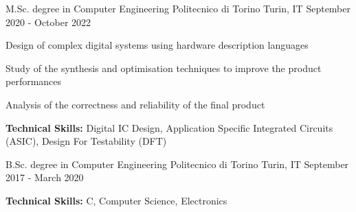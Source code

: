 

\begin{cventries}

  \cventry
    {M.Sc. degree in Computer Engineering} %
    {Politecnico di Torino} %
    {Turin, IT} %
    {September 2020 - October 2022} %
    {
      \begin{cvitems} %
        \item {Design of complex digital systems using hardware description languages}
        \item {Study of the synthesis and optimisation techniques to improve the product performances}
        \item {Analysis of the correctness and reliability of the final product}
        \item {\textbf{Technical Skills:} Digital IC Design, Application Specific Integrated Circuits (ASIC), Design For Testability (DFT)}
      \end{cvitems}
    }
    
  \cventry
    {B.Sc. degree in Computer Engineering} %
    {Politecnico di Torino} %
    {Turin, IT} %
    {September 2017 - March 2020} %
    {
      \begin{cvitems} %
        \item {\textbf{Technical Skills:} C, Computer Science, Electronics}
      \end{cvitems}
    }
    
\end{cventries}
